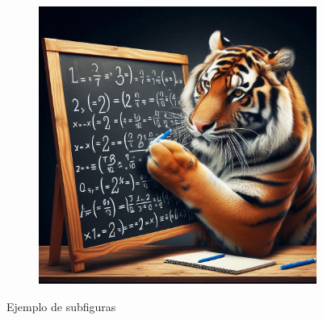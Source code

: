 \begin{figure}[H]
\begin{subfigure}[b]{0.3\textwidth}
        \caption{}
        \label{subfig:test2}
    \end{subfigure}
    \hfill
    \begin{subfigure}[b]{0.3\textwidth}
        \centering
        \includegraphics[width = \textwidth]{imagenes/test2.jpeg}
        \caption{}
        \label{subfig:test3}
    \end{subfigure}
        \caption{Ejemplo de subfiguras}
        \label{fig:test1}
\end{figure}

